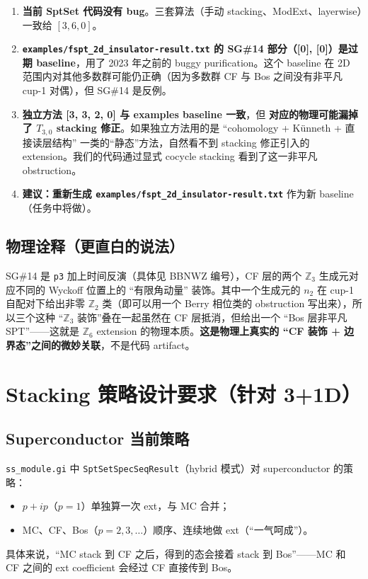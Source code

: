 \documentclass[a4paper,fontset=ubuntu,12pt]{ctexart}
\newcommand{\ZZ}{\mathbb{Z}}
\begin{document}
\begin{enumerate}
\item \textbf{当前 SptSet 代码没有 bug}。三套算法（手动 stacking、ModExt、layerwise）一致给 $[3, 6, 0]$。
\item \textbf{\texttt{examples/fspt\_2d\_insulator-result.txt} 的 SG\#14 部分（[0], [0]）是过期 baseline}，用了 2023 年之前的 buggy purification。这个 baseline 在 2D 范围内对其他多数群可能仍正确（因为多数群 CF 与 Bos 之间没有非平凡 cup-1 对偶），但 SG\#14 是反例。
\item \textbf{独立方法 [3, 3, 2, 0] 与 examples baseline 一致}，但 \textbf{对应的物理可能漏掉了 $T_{3, 0}$ stacking 修正}。如果独立方法用的是 ``cohomology + Künneth + 直接读层结构'' 一类的``静态''方法，自然看不到 stacking 修正引入的 extension。我们的代码通过显式 cocycle stacking 看到了这一非平凡 obstruction。
\item \textbf{建议：重新生成 \texttt{examples/fspt\_2d\_insulator-result.txt}} 作为新 baseline（任务中将做）。
\end{enumerate}

\subsection{物理诠释（更直白的说法）}

SG\#14 是 \texttt{p3} 加上时间反演（具体见 BBNWZ 编号），CF 层的两个 $\ZZ_3$ 生成元对应不同的 Wyckoff 位置上的 ``有限角动量'' 装饰。其中一个生成元的 $n_2$ 在 cup-1 自配对下给出非零 $\ZZ_2$ 类（即可以用一个 Berry 相位类的 obstruction 写出来），所以三个这种 ``$\ZZ_3$ 装饰''叠在一起虽然在 CF 层抵消，但给出一个 ``Bos 层非平凡 SPT''——这就是 $\ZZ_6$ extension 的物理本质。\textbf{这是物理上真实的 ``CF 装饰 + 边界态''之间的微妙关联}，不是代码 artifact。

\section{Stacking 策略设计要求（针对 3+1D）}
\label{sec:stacking-strategy}

\subsection{Superconductor 当前策略}

\texttt{ss\_module.gi} 中 \texttt{SptSetSpecSeqResult}（hybrid 模式）对 superconductor 的策略：
\begin{itemize}
\item $p + ip$（$p = 1$）单独算一次 ext，与 MC 合并；
\item MC、CF、Bos（$p = 2, 3, \ldots$）顺序、连续地做 ext（``一气呵成''）。
\end{itemize}
具体来说，``MC stack 到 CF 之后，得到的态会接着 stack 到 Bos''——MC 和 CF 之间的 ext coefficient 会经过 CF 直接传到 Bos。
\end{document}
